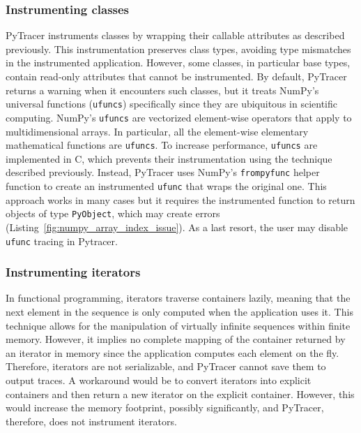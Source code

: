 \documentclass[11pt]{article}
\newcommand{\pytracer}[0]{PyTracer\xspace}
\begin{document}
\subsubsection{Instrumenting classes}

\pytracer instruments classes by wrapping their callable attributes as described previously. 
This instrumentation preserves class types, avoiding type mismatches in the instrumented application.
However, some classes, in particular base types, contain read-only attributes that cannot be instrumented. 
By default, \pytracer returns a warning when it encounters such classes, 
but it treats NumPy's universal functions (\texttt{ufuncs}) specifically since they are ubiquitous in scientific computing. 
NumPy's \texttt{ufuncs} are vectorized element-wise operators that apply to multidimensional arrays. 
In particular, all the element-wise elementary mathematical functions are \texttt{ufuncs}.  
To increase performance, \texttt{ufuncs} are implemented in C, which prevents their instrumentation using the technique described previously. 
Instead, \pytracer uses NumPy's \texttt{frompyfunc} helper function to create an instrumented \texttt{ufunc} that wraps the original one.
This approach works in many cases but it requires the instrumented function to return objects of type \texttt{PyObject}, 
which may create errors (Listing~\ref{fig:numpy_array_index_issue}). 
As a last resort, the user may disable \texttt{ufunc} tracing in Pytracer.


\subsubsection{Instrumenting iterators}
In functional programming, iterators traverse containers lazily, meaning that the next element in the sequence is only computed when the application uses it. This technique allows for the manipulation of virtually infinite sequences within finite memory. However, it implies no complete mapping of the container returned by an iterator in memory since the application computes each element on the fly. Therefore, iterators are not serializable, and \pytracer cannot save them to output traces. 
A workaround would be to convert iterators into explicit containers and then return a new iterator on the explicit container. However, this would increase the memory footprint, possibly significantly, and \pytracer, therefore, does not instrument iterators.
\end{document}
